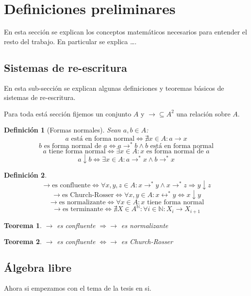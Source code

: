 \documentclass[fleqn]{amsbook} %
\theoremstyle{customstyle}
\newtheorem{definition}{Definición}[section]
\newtheorem{theorem}{Teorema}[section]
\begin{document}
\fontsize{16pt}{19pt}\selectfont %


\section{Definiciones preliminares}

En esta sección se explican los conceptos matemáticos necesarios para entender el resto del trabajo.
En particular se explica …. %

\subsection{Sistemas de re-escritura}

En esta sub-sección se explican algunas definiciones y teoremas básicos de sistemas de re-escritura.

Para toda está sección fijemos un conjunto $A$ y $→ ⊆ A^2$ una relación sobre $A$.

\begin{definition}[Formas normales]
Sean $a, b ∈ A$:
\[ a\text{ está en forma normal} ⇔ ∄x ∈ A : a → x \]
\[ b\text{ es forma normal de } a ⇔ a →^* b ∧ b\text{ está en forma normal} \]
\[ a\text{ tiene forma normal} ⇔ ∃x ∈ A : x\text{ es forma normal de }a \]
\[ a ↓ b ⇔ ∃x ∈ A : a →^* x ∧ b →^* x \]
\end{definition}

\begin{definition}
\[ → \text{es confluente} ⇔ ∀x, y, z ∈ A : x →^* y ∧ x →^*z ⇒ y ↓ z \]
\[ → \text{es Church-Rosser} ⇔ ∀x, y ∈ A : x ↔^* y ⇔ x ↓ y \]
\[ → \text{es normalizante} ⇔ ∀x ∈ A : x\text{ tiene forma normal} \]
\[ → \text{es terminante} ⇔ ∄X ∈ A^ℕ : ∀i ∈ ℕ : X_i → X_{i + 1} \]
\end{definition}

\begin{theorem}\label{thm:confluente ⇒ normalizante}
$→$ es confluente $⇒ →$ es normalizante
\end{theorem}

\begin{theorem}\label{thm:confluente ⇔ Church-Rosser}
$→$ es confluente $⇔ →$ es Church-Rosser
\end{theorem}

\subsection{Álgebra libre}

Ahora si empezamos con el tema de la tesis en si.
\end{document}
